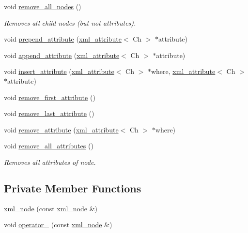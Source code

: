 \begin{DoxyCompactItemize}
void \hyperlink{singletonrapidxml_1_1xml__node_a95735358b079ae0adcfbbac69aa1fbc3}{remove\+\_\+all\+\_\+nodes} ()
\begin{DoxyCompactList}\small\item\em Removes all child nodes (but not attributes). \end{DoxyCompactList}\item 
void \hyperlink{singletonrapidxml_1_1xml__node_a8b62ee76489faf8e2d1210869d547684}{prepend\+\_\+attribute} (\hyperlink{singletonrapidxml_1_1xml__attribute}{xml\+\_\+attribute}$<$ Ch $>$ $\ast$attribute)
\item 
void \hyperlink{singletonrapidxml_1_1xml__node_a33ce3386f8c42dd4db658b75cbb6e6c4}{append\+\_\+attribute} (\hyperlink{singletonrapidxml_1_1xml__attribute}{xml\+\_\+attribute}$<$ Ch $>$ $\ast$attribute)
\item 
void \hyperlink{singletonrapidxml_1_1xml__node_a9fe659cdf4a5b3bbf5e8ffc98db5a84f}{insert\+\_\+attribute} (\hyperlink{singletonrapidxml_1_1xml__attribute}{xml\+\_\+attribute}$<$ Ch $>$ $\ast$where, \hyperlink{singletonrapidxml_1_1xml__attribute}{xml\+\_\+attribute}$<$ Ch $>$ $\ast$attribute)
\item 
void \hyperlink{singletonrapidxml_1_1xml__node_aa95192d2a165cca16c551ed2a2a06aec}{remove\+\_\+first\+\_\+attribute} ()
\item 
void \hyperlink{singletonrapidxml_1_1xml__node_a1781a2cbedc9a51d609ad5b528125635}{remove\+\_\+last\+\_\+attribute} ()
\item 
void \hyperlink{singletonrapidxml_1_1xml__node_a6f97b1b4f46a94a4587915df3c0c6b57}{remove\+\_\+attribute} (\hyperlink{singletonrapidxml_1_1xml__attribute}{xml\+\_\+attribute}$<$ Ch $>$ $\ast$where)
\item 
void \hyperlink{singletonrapidxml_1_1xml__node_aa8d5d9484aa1eb5ff1841a073c84c1aa}{remove\+\_\+all\+\_\+attributes} ()
\begin{DoxyCompactList}\small\item\em Removes all attributes of node. \end{DoxyCompactList}\end{DoxyCompactItemize}
\subsection*{Private Member Functions}
\begin{DoxyCompactItemize}
\item 
\hyperlink{singletonrapidxml_1_1xml__node_af5f365f98059708e7180c0fbcf1412c5}{xml\+\_\+node} (const \hyperlink{singletonrapidxml_1_1xml__node}{xml\+\_\+node} \&)
\item 
void \hyperlink{singletonrapidxml_1_1xml__node_aa9320e2dd58cfbe5fe4b43b9f0d8c788}{operator=} (const \hyperlink{singletonrapidxml_1_1xml__node}{xml\+\_\+node} \&)
\end{DoxyCompactItemize}
